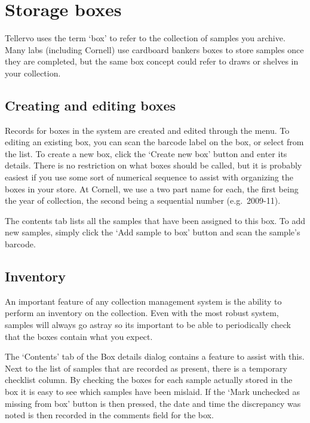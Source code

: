 \section{Storage boxes}
\label{txt:assignToBox}
Tellervo uses the term `box' to refer to the collection of samples you archive.  Many labs (including Cornell) use cardboard bankers boxes to store samples once they are completed, but the same box concept could refer to draws or shelves in your collection.

\subsection{Creating and editing boxes}
Records for boxes in the system are created and edited through the  menu.  To editing an existing box, you can scan the barcode label on the box, or select from the list.  To create a new box, click the `Create new box' button and enter its details.  There is no restriction on what boxes should be called, but it is probably easiest if you use some sort of numerical sequence to assist with organizing the boxes in your store.  At Cornell, we use a two part name for each, the first being the year of collection, the second being a sequential number (e.g.\ 2009-11).

The contents tab lists all the samples that have been assigned to this box.  To add new samples, simply click the `Add sample to box' button and scan the sample's barcode.  

\subsection{Inventory}
An important feature of any collection management system is the ability to perform an inventory on the collection.  Even with the most robust system, samples will always go astray so its important to be able to periodically check that the boxes contain what you expect.

The `Contents' tab of the Box details dialog contains a feature to assist with this.  Next to the list of samples that are recorded as present, there is a temporary checklist column.  By checking the boxes for each sample actually stored in the box it is easy to see which samples have been mislaid.  If the `Mark unchecked as missing from box' button is then pressed, the date and time the discrepancy was noted is then recorded in the comments field for the box.

